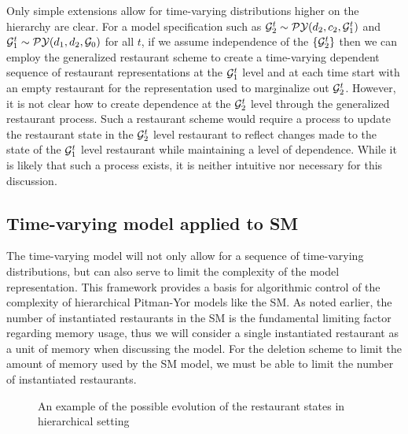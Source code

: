 Only simple extensions allow for time-varying distributions higher on the hierarchy are clear.  For a model specification such as $\G_2^t \sim \PY(d_2, c_2, \G_1^t)$ and $\G_1^t  \sim \PY(d_1,d_2,\G_0)$ for all $t$, if we assume independence of the $\{ \G_2^t \}$ then we can employ the generalized restaurant scheme to create a time-varying dependent sequence of restaurant representations at the  $\G_1^t$ level and at each time start with an empty restaurant for the representation used to marginalize out $\G_2^t$.  However, it is not clear how to create dependence at the $\G_2^t$ level through the generalized restaurant process.  Such a restaurant scheme would require a process to update the restaurant state in the $\G_2^t$ level restaurant to reflect changes made to the state of the $\G_1^t$ level restaurant while maintaining a level of dependence.  While it is likely that such a process exists, it is neither intuitive nor necessary for this discussion.

\subsection{Time-varying model applied to SM}

The time-varying model will not only allow for a sequence of time-varying distributions, but can also serve to limit the complexity of the model representation. This framework provides a basis for algorithmic control of the complexity of hierarchical Pitman-Yor models like the SM.  As noted earlier, the number of instantiated restaurants in the SM is the fundamental limiting factor regarding memory usage, thus we will consider a single instantiated restaurant as a unit of memory when discussing the model. For the deletion scheme to limit the amount of memory used by the SM model, we must be able to limit the number of instantiated restaurants.

\begin{figure}[t] 
	\begin{center}
		\caption{An example of the possible evolution of the restaurant states in hierarchical setting}
	\end{center} 
	\label{figResultsCC}
\end{figure} 


